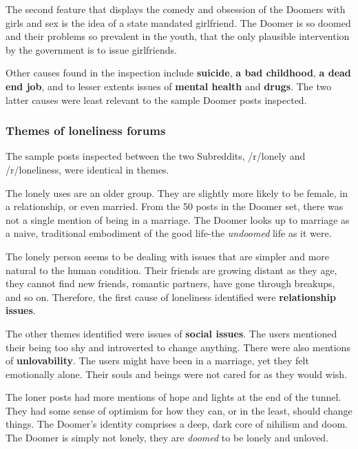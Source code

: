 \documentclass[../report.tex]{subfiles}
\begin{document}
The second feature that displays the comedy and obsession of the Doomers with girls and sex is the idea of a state mandated girlfriend. 
The Doomer is so doomed and their problems so prevalent in the youth, that the only plausible intervention by the government is to issue girlfriends. 

Other causes found in the inspection include \textbf{suicide}, \textbf{a bad childhood}, \textbf{a dead end job}, and to lesser extents issues of \textbf{mental health} and \textbf{drugs}. The two latter causes were least relevant to the sample Doomer posts inspected.

\subsubsection{Themes of loneliness forums}
The sample posts inspected between the two Subreddits, /r/lonely and /r/loneliness, were identical in themes. 

The lonely uses are an older group.
They are slightly more likely to be female, in a relationship, or even married.
From the 50 posts in the Doomer set, there was not a single mention of being in a marriage. 
The Doomer looks up to marriage as a naive, traditional embodiment of the good life\--the \textit{undoomed} life as it were. 

The lonely person seems to be dealing with issues that are simpler and more natural to the human condition. 
Their friends are growing distant as they age, they cannot find new friends, romantic partners, have gone through breakups, and so on. 
Therefore, the first cause of loneliness identified were \textbf{relationship issues}.

The other themes identified were issues of \textbf{social issues}. The users mentioned their being too shy and introverted to change anything. 
There were also mentions of \textbf{unlovability}.
The users might have been in a marriage, yet they felt emotionally alone.
Their souls and beings were not cared for as they would wish.

The loner posts had more mentions of hope and lights at the end of the tunnel. 
They had some sense of optimism for how they can, or in the least, should change things.
The Doomer's identity comprises a deep, dark core of nihilism and doom.
The Doomer is simply not lonely, they are \textit{doomed} to be lonely and unloved. 
\end{document}
